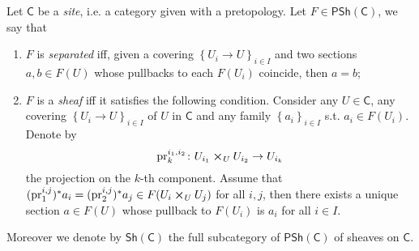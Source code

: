 \begin{defn}[Sheaves]
	Let $\mathsf{C}$ be a {\em site}, i.e. a category given with a pretopology.
	Let $F \in \mathsf{PSh}(\mathsf{C})$, we say that
\begin{enumerate}
	\item $F$ is {\em separated} iff, given a covering $\left\{ U_{ i } \to U \right\}_{ i \in I }$
		and two sections $a,b \in F(U)$ whose pullbacks to each $F(U_i)$ coincide,
		then $a = b$;
	\item $F$ is a {\em sheaf} iff it satisfies the following condition.
		Consider any $U \in \mathsf{C}$, any covering $\left\{ U_{ i } \to U \right\}_{ i \in I }$
		of $U$ in $\mathsf{C}$ and any family $\left\{ a_i \right\}_{i \in I}$ s.t.
		$a_i \in F(U_i)$.
		Denote by 
		\begin{equation*}
		\mathrm{pr}^{i_1,i_2}_k\colon U_{i_1} \cross_{ U } U_{i_2} \to U_{i_k}
		\end{equation*} 
		the projection on the $k$-th component.
		Assume that $(\mathrm{pr}^{i,j}_1)^* a_i = 
		(\mathrm{pr}^{i,j}_2)^* a_j \in F( U_i \cross_{ U } U_j )$
		for all $i, j$, then there exists a unique section $a \in F(U)$
		whose pullback to $F(U_i)$ is $a_i$ for all $i \in I$.
\end{enumerate}
	Moreover we denote by $\mathsf{Sh}(\mathsf{C})$ the full subcategory of $\mathsf{PSh}(\mathsf{C})$
	of sheaves on $\mathsf{C}$.
\end{defn}


